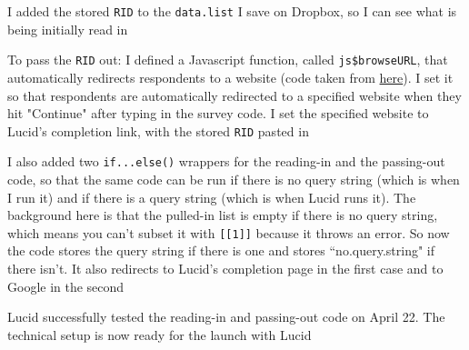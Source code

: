 \documentclass[12pt]{article}
\begin{document}
\begin{coi}
\begin{coi}
\begin{coi}
						\item I added the stored \texttt{RID} to the \texttt{data.list} I save on Dropbox, so I can see what is being initially read in
						\item To pass the \texttt{RID} out: I defined a Javascript function, called \texttt{js\$browseURL}, that automatically redirects respondents to a website (code taken from \href{https://stackoverflow.com/questions/41426016/shiny-open-multiple-browser-tabs?rq=1}{here}). I set it so that respondents are automatically redirected to a specified website when they hit "Continue" after typing in the survey code. I set the specified website to Lucid's completion link, with the stored \texttt{RID} pasted in
						\item I also added two \texttt{if...else()} wrappers for the reading-in and the passing-out code, so that the same code can be run if there is no query string (which is when I run it) and if there is a query string (which is when Lucid runs it). The background here is that the pulled-in list is empty if there is no query string, which means you can't subset it with \texttt{[[1]]} because it throws an error. So now the code stores the query string if there is one and stores ``no.query.string" if there isn't. It also redirects to Lucid's completion page in the first case and to Google in the second
					\end{coi}
				\item Lucid successfully tested the reading-in and passing-out code on April 22. The technical setup is now ready for the launch with Lucid
			\end{coi}
	\end{coi}
	
\end{document}
